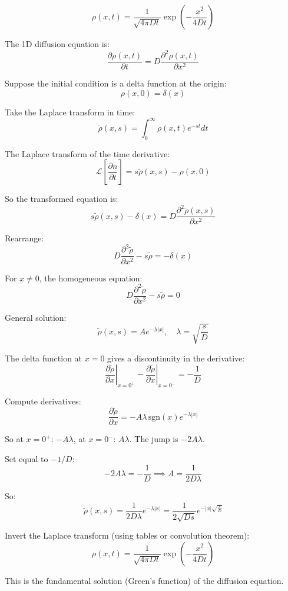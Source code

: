 \documentclass[
  letterpaper,
  enabledeprecatedfontcommands]{report}
\begin{document}
\[
\rho(x, t) = \frac{1}{\sqrt{4\pi D t}} \exp\left(-\frac{x^2}{4Dt}\right)
\]

\begin{tcolorbox}[enhanced jigsaw, toprule=.15mm, opacityback=0, colbacktitle=quarto-callout-note-color!10!white, title=\textcolor{quarto-callout-note-color}{\faInfo}\hspace{0.5em}{Solution of the diffusion equation using Laplace transform}, leftrule=.75mm, rightrule=.15mm, bottomtitle=1mm, breakable, colframe=quarto-callout-note-color-frame, colback=white, toptitle=1mm, left=2mm, titlerule=0mm, coltitle=black, arc=.35mm, bottomrule=.15mm, opacitybacktitle=0.6]

The 1D diffusion equation is: \[
\frac{\partial \rho(x, t)}{\partial t} = D \frac{\partial^2 \rho(x, t)}{\partial x^2}
\]

Suppose the initial condition is a delta function at the origin: \[
\rho(x, 0) = \delta(x)
\]

Take the Laplace transform in time: \[
\tilde{\rho}(x, s) = \int_0^\infty \rho(x, t) e^{-st} dt
\]

The Laplace transform of the time derivative: \[
\mathcal{L}\left[\frac{\partial n}{\partial t}\right] = s\tilde{\rho}(x, s) - \rho(x, 0)
\]

So the transformed equation is: \[
s\tilde{\rho}(x, s) - \delta(x) = D \frac{\partial^2 \tilde{\rho}(x, s)}{\partial x^2}
\]

Rearrange: \[
D \frac{\partial^2 \tilde{\rho}}{\partial x^2} - s\tilde{\rho} = -\delta(x)
\]

For \(x \neq 0\), the homogeneous equation: \[
D \frac{\partial^2 \tilde{\rho}}{\partial x^2} - s\tilde{\rho} = 0
\]

General solution: \[
\tilde{\rho}(x, s) = A e^{-\lambda |x|}, \quad \lambda = \sqrt{\frac{s}{D}}
\]

The delta function at \(x=0\) gives a discontinuity in the derivative:
\[
\left.\frac{\partial \tilde{\rho}}{\partial x}\right|_{x=0^+} - \left.\frac{\partial \tilde{\rho}}{\partial x}\right|_{x=0^-} = -\frac{1}{D}
\]

Compute derivatives: \[
\frac{\partial \tilde{\rho}}{\partial x} = -A \lambda \, \text{sgn}(x) e^{-\lambda |x|}
\]

So at \(x=0^+\): \(-A\lambda\), at \(x=0^-\): \(A\lambda\). The jump is
\(-2A\lambda\).

Set equal to \(-1/D\): \[
-2A\lambda = -\frac{1}{D} \implies A = \frac{1}{2D\lambda}
\]

So: \[
\tilde{\rho}(x, s) = \frac{1}{2D\lambda} e^{-\lambda |x|} = \frac{1}{2\sqrt{Ds}} e^{-|x|\sqrt{\frac{s}{D}}}
\]

Invert the Laplace transform (using tables or convolution theorem): \[
\rho(x, t) = \frac{1}{\sqrt{4\pi D t}} \exp\left(-\frac{x^2}{4Dt}\right)
\]

This is the fundamental solution (Green's function) of the diffusion
equation.

\end{tcolorbox}
\end{document}
